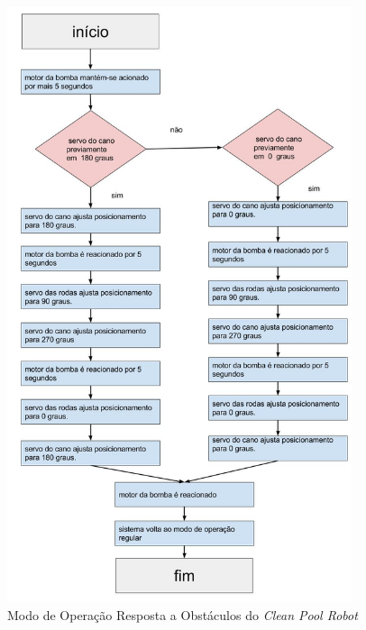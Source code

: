 \begin{figure}[h]
  \centering
  \includegraphics[width=0.9\textwidth]{figures/flow-robot-obstacle.jpg}
  \caption{Modo de Operação Resposta a Obstáculos do \textit{Clean Pool Robot}}
  \label{fig:schema-way-robot}
\end{figure}
\FloatBarrier

